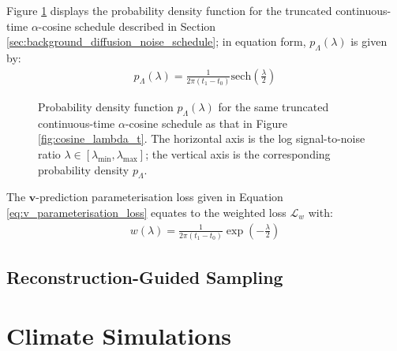 \documentclass[ oneside,%
                    author={George Herbert},
                    degree={MSci},
                     title={Video Diffusion Models for Climate Simulations},
                  subtitle={}]{dissertation}
\begin{document}
Figure \ref{fig:p_lambda} displays the probability density function for the truncated continuous-time $\alpha$-cosine schedule described in Section \ref{sec:background_diffusion_noise_schedule}; in equation form, $p_\Lambda(\lambda)$ is given by:
\begin{align}
      p_\Lambda(\lambda)=\frac{1}{2\pi(t_1-t_0)}\mathrm{sech}\left(\frac{\lambda}{2}\right)
\end{align}
\begin{figure}[htbp]
      \centering
      \caption{Probability density function $p_\Lambda(\lambda)$ for the same truncated continuous-time $\alpha$-cosine schedule as that in Figure \ref{fig:cosine_lambda_t}. The horizontal axis is the log signal-to-noise ratio $\lambda\in[\lambda_{\min}, \lambda_{\max}]$; the vertical axis is the corresponding probability density $p_\Lambda$.}
      \label{fig:p_lambda}
\end{figure}

The $\mathbf{v}$-prediction parameterisation loss given in Equation \ref{eq:v_parameterisation_loss} equates to the weighted loss $\mathcal{L}_w$ with:
\begin{align}
      w(\lambda)=\frac{1}{2\pi(t_1-t_0)}\exp\left(-\frac{\lambda}{2}\right)
\end{align}


\subsection{Reconstruction-Guided Sampling}
\label{sec:background_diffusion_reconstruction_guided_sampling}

\section{Climate Simulations}
\label{sec:background_climate}
\end{document}

